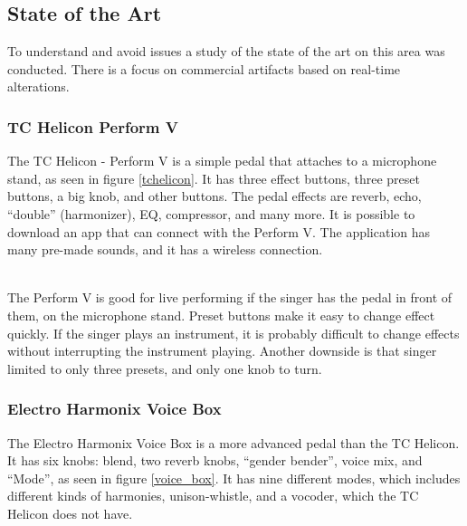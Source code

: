\subsection{State of the Art}
To understand and avoid issues a study of the state of the art on this area was conducted. There is a focus on commercial artifacts based on real-time alterations. 

\subsubsection{TC Helicon Perform V}

The TC Helicon - Perform V is a simple pedal that attaches to a microphone stand, as seen in figure \ref{tchelicon}\citep{TC}. It has three effect buttons, three preset buttons, a big knob, and other buttons. The pedal effects are reverb, echo, “double” (harmonizer), EQ, compressor, and many more. It is possible to download an app that can connect with the Perform V. The application has many pre-made sounds, and it has a wireless connection. \\

\begin{minipage}{\linewidth}%
\label{tchelicon}
\end{minipage}\\

The Perform V is good for live performing if the singer has the pedal in front of them, on the microphone stand. Preset buttons make it easy to change effect quickly. 
If the singer plays an instrument, it is probably difficult to change effects without interrupting the instrument playing. Another downside is that singer limited to only three presets, and only one knob to turn.

\subsubsection{Electro Harmonix Voice Box}

The Electro Harmonix Voice Box is a more advanced pedal than the TC Helicon\citep{VoiceBox}. It has six knobs: blend, two reverb knobs, “gender bender”, voice mix, and “Mode”, as seen in figure \ref{voice_box}. It has nine different modes, which includes different kinds of harmonies, unison-whistle, and a vocoder, which the TC Helicon does not have.\\

